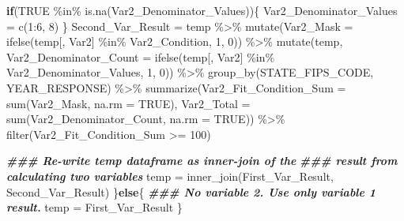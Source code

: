 \documentclass[
]{article}
\newenvironment{Shaded}{\begin{snugshade}}{\end{snugshade}}
\newcommand{\AttributeTok}[1]{\textcolor[rgb]{0.77,0.63,0.00}{#1}}
\newcommand{\ConstantTok}[1]{\textcolor[rgb]{0.00,0.00,0.00}{#1}}
\newcommand{\ControlFlowTok}[1]{\textcolor[rgb]{0.13,0.29,0.53}{\textbf{#1}}}
\newcommand{\DecValTok}[1]{\textcolor[rgb]{0.00,0.00,0.81}{#1}}
\newcommand{\DocumentationTok}[1]{\textcolor[rgb]{0.56,0.35,0.01}{\textbf{\textit{#1}}}}
\newcommand{\FunctionTok}[1]{\textcolor[rgb]{0.00,0.00,0.00}{#1}}
\newcommand{\NormalTok}[1]{#1}
\newcommand{\OtherTok}[1]{\textcolor[rgb]{0.56,0.35,0.01}{#1}}
\newcommand{\SpecialCharTok}[1]{\textcolor[rgb]{0.00,0.00,0.00}{#1}}
\begin{document}
\begin{Shaded}
\begin{Highlighting}[]
    \ControlFlowTok{if}\NormalTok{(}\ConstantTok{TRUE} \SpecialCharTok{\%in\%} \FunctionTok{is.na}\NormalTok{(Var2\_Denominator\_Values))\{}
\NormalTok{      Var2\_Denominator\_Values }\OtherTok{=} \FunctionTok{c}\NormalTok{(}\DecValTok{1}\SpecialCharTok{:}\DecValTok{6}\NormalTok{, }\DecValTok{8}\NormalTok{)}
\NormalTok{    \}}
\NormalTok{    Second\_Var\_Result }\OtherTok{=}\NormalTok{ temp }\SpecialCharTok{\%\textgreater{}\%} 
      \FunctionTok{mutate}\NormalTok{(}\AttributeTok{Var2\_Mask =} \FunctionTok{ifelse}\NormalTok{(temp[, Var2] }\SpecialCharTok{\%in\%}\NormalTok{ Var2\_Condition, }\DecValTok{1}\NormalTok{, }\DecValTok{0}\NormalTok{)) }\SpecialCharTok{\%\textgreater{}\%} 
      \FunctionTok{mutate}\NormalTok{(temp, }\AttributeTok{Var2\_Denominator\_Count =} 
               \FunctionTok{ifelse}\NormalTok{(temp[, Var2] }\SpecialCharTok{\%in\%}\NormalTok{ Var2\_Denominator\_Values, }\DecValTok{1}\NormalTok{, }\DecValTok{0}\NormalTok{)) }\SpecialCharTok{\%\textgreater{}\%}
      \FunctionTok{group\_by}\NormalTok{(STATE\_FIPS\_CODE, YEAR\_RESPONSE) }\SpecialCharTok{\%\textgreater{}\%} 
      \FunctionTok{summarize}\NormalTok{(}\AttributeTok{Var2\_Fit\_Condition\_Sum =} \FunctionTok{sum}\NormalTok{(Var2\_Mask, }\AttributeTok{na.rm =} \ConstantTok{TRUE}\NormalTok{), }
                \AttributeTok{Var2\_Total =} \FunctionTok{sum}\NormalTok{(Var2\_Denominator\_Count, }\AttributeTok{na.rm =} \ConstantTok{TRUE}\NormalTok{)) }\SpecialCharTok{\%\textgreater{}\%}
      \FunctionTok{filter}\NormalTok{(Var2\_Fit\_Condition\_Sum }\SpecialCharTok{\textgreater{}=} \DecValTok{100}\NormalTok{)}
    
    \DocumentationTok{\#\#\# Re{-}write temp dataframe as inner{-}join of the }
    \DocumentationTok{\#\#\# result from calculating two variables}
\NormalTok{    temp }\OtherTok{=} \FunctionTok{inner\_join}\NormalTok{(First\_Var\_Result, Second\_Var\_Result)}
\NormalTok{  \}}\ControlFlowTok{else}\NormalTok{\{}
    \DocumentationTok{\#\#\# No variable 2. Use only variable 1 result.}
\NormalTok{    temp }\OtherTok{=}\NormalTok{ First\_Var\_Result}
\NormalTok{  \}}
  

\end{Highlighting}
\end{Shaded}
\end{document}

